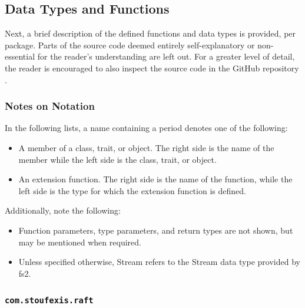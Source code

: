 \subsection{Data Types and Functions}

Next, a brief description of the defined functions and data types is provided, per package. Parts of the source code deemed entirely self-explanatory or non-essential for the reader's understanding are left out. For a greater level of detail, the reader is encouraged to also inspect the source code in the GitHub repository \cite{stoufexis-raft}.

\subsubsection{Notes on Notation}

In the following lists, a name containing a period denotes one of the following:
\begin{itemize}
    \item A member of a class, trait, or object. The right side is the name of the member while the left side is the class, trait, or object.
    \item An extension function. The right side is the name of the function, while the left side is the type for which the extension function is defined.
\end{itemize}

Additionally, note the following:
\begin{itemize}
    \item Function parameters, type parameters, and return types are not shown, but may be mentioned when required.
    \item Unless specified otherwise, Stream refers to the Stream data type provided by fs2.
\end{itemize}

\subsubsection{\lstinline|com.stoufexis.raft|}

